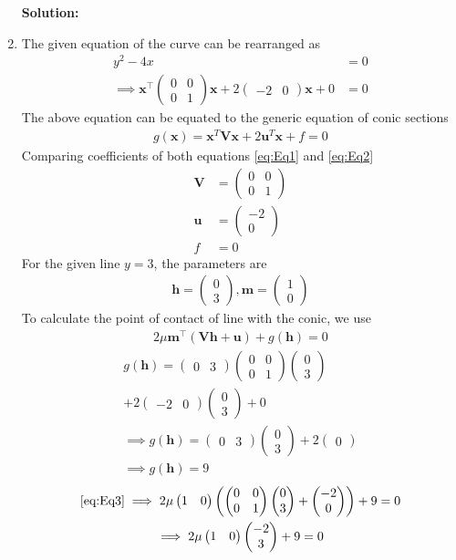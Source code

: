 \documentclass[12pt]{article}
\providecommand{\brak}[1]{\ensuremath{\left(#1\right)}}
\newcommand{\solution}{\noindent \textbf{Solution: }}
\newcommand{\myvec}[1]{\ensuremath{\begin{pmatrix}#1\end{pmatrix}}}
\let\vec\mathbf
\begin{document}
\begin{enumerate}
\solution 
\item The given equation of the curve can be rearranged as
\begin{align}
	y^2-4x &= 0 \\
        \label{eq:Eq1}
	\implies \vec{x}^\top\myvec{0 & 0 \\ 0 & 1}\vec{x} + 2\myvec{-2 & 0}\vec{x}+0 &= 0 
\end{align}
The above equation can be equated to the generic equation of conic sections
\begin{align}
	\label{eq:Eq2}
	g\brak{\vec{x}} = \vec{x}^T\vec{V}\vec{x} + 2\vec{u}^T\vec{x} + f = 0 
\end{align}
Comparing coefficients of both equations \eqref{eq:Eq1} and \eqref{eq:Eq2} 
\begin{align}
	\vec{V} &= \myvec{ 0 & 0 \\ 0 & 1} \\
	\vec{u} &= \myvec{-2 \\ 0} \\
	f &= 0
\end{align}
For the given line $y=3$, the parameters are
\begin{align}
	\vec{h} = \myvec{0 \\ 3} , \vec{m} = \myvec{1 \\ 0 }
\end{align}
To calculate the point of contact of line with the conic, we use
\begin{align}
	\label{eq:Eq3}
	2\mu\vec{m}^\top\brak{\vec{V}\vec{h}+\vec{u}}+g\brak{\vec{h}}= 0 
\end{align}
\begin{multline}
	g\brak{\vec{h}}=\myvec{0 & 3}\myvec{0 & 0 \\ 0 & 1}\myvec{0 \\3} \\
	+ 2\myvec{-2 & 0}\myvec{0 \\ 3} + 0 \\
	 \implies g\brak{\vec{h}} = \myvec{0 & 3}\myvec{0 \\3} + 2\myvec{0} \\ 
	 \implies g\brak{\vec{h}} = 9 
\end{multline}
\begin{multline}
	\eqref{eq:Eq3} \implies 2\mu\myvec{1 & 0}\brak{\myvec{0 & 0 \\ 0 & 1}\myvec{0 \\3}+\myvec{-2 \\ 0}} + 9 = 0 \\
	\implies 2\mu\myvec{1 & 0}\myvec{-2 \\3} + 9 = 0 \\

\end{multline}
\end{enumerate}
\end{document}
